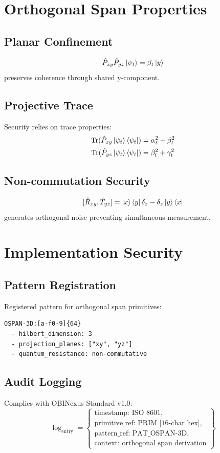\documentclass[12pt]{article}
\begin{document}
\section{Orthogonal Span Properties}

\subsection{Planar Confinement}
\[
\hat{P}_{xy}\hat{P}_{yz}\ket{\psi_t} = \beta_t\ket{y}
\]
preserves coherence through shared y-component.

\subsection{Projective Trace}
Security relies on trace properties:
\begin{align*}
\operatorname{Tr}(\hat{P}_{xy} \ket{\psi_t}\bra{\psi_t}) &= \alpha_t^2 + \beta_t^2 \\
\operatorname{Tr}(\hat{P}_{yz} \ket{\psi_t}\bra{\psi_t}) &= \beta_t^2 + \gamma_t^2
\end{align*}

\subsection{Non-commutation Security}
\[
[\hat{R}_{xy}, \hat{T}_{yz}] = \ket{x}\bra{y}\delta_z - \delta_z\ket{y}\bra{x}
\]
generates orthogonal noise preventing simultaneous measurement.

\section{Implementation Security}

\subsection{Pattern Registration}
Registered pattern for orthogonal span primitives:
\begin{verbatim}
OSPAN-3D:[a-f0-9]{64}
  - hilbert_dimension: 3
  - projection_planes: ["xy", "yz"]
  - quantum_resistance: non-commutative
\end{verbatim}

\subsection{Audit Logging}
Complies with OBINexus Standard v1.0:
\[
\log_{\text{entry}} = \left\{ 
\begin{array}{l}
\text{timestamp: ISO 8601}, \\
\text{primitive\_ref: PRIM\_[16-char hex]}, \\
\text{pattern\_ref: PAT\_OSPAN-3D}, \\
\text{context: orthogonal\_span\_derivation}
\end{array} 
\right\}
\]
\end{document}
